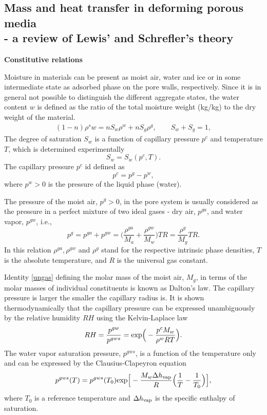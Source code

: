 \subsection{Mass and heat transfer in deforming porous media \\- a review of Lewis' and Schrefler's theory}
\label{keynote}
{\bf Constitutive relations}

Moisture in materials can be present as moist air, water and ice or in some intermediate state as adsorbed phase 
on the pore walls, respectively. Since it is in general not possible to distinguish the different aggregate states, 
the water content $w$ is defined as the ratio of the total moisture weight (kg/kg) to the dry weight of the material. 
\begin{eqnarray}\label{w_S}
(1-n) \rho^sw = nS_w\rho^w + nS_g\rho^g, \qquad S_w + S_g = 1,
\end{eqnarray}
The degree of saturation $S_w$ is a function of capillary pressure $p^c$ and temperature $T$, 
which is determined experimentally
\begin{equation}\label{Sw}
S_w = S_w(p^c,T).
\end{equation}
The capillary pressure $p^c$ id defined as
\begin{equation}\label{pc}
p^c = p^g - p^w,
\end{equation}
where $p^w > 0$ is the pressure of the liquid phase (water). 

The pressure of the moist air, $p^g > 0$, in the pore system is usually considered as the pressure in a perfect 
mixture of two ideal gases - dry air, $p^{ga}$, and water vapor, $p^{gw}$, i.e.,
\begin{equation}\label{ungas}
p^g = p^{ga} + p^{gw}=\Big( \frac{\rho^{ga}}{M_a} + \frac{\rho^{gw}}{M_w} \Big)T 
R = \frac{\rho^{g}}{M_g}T R.
\end{equation}
In this relation $\rho^{ga}, \rho^{gw}$ and $\rho^{g}$ stand for the respective intrinsic phase densities, $T$ 
is the absolute temperature, and $R$ is the universal gas constant.
 
Identity \eqref{ungas} defining the molar mass of the moist air, $M_g$, in terms of the molar masses of individual 
constituents is known as Dalton's law. The capillary pressure is larger the smaller the capillary radius is. It is shown 
thermodynamically that the capillary pressure can be expressed unambiguously by the relative humidity $RH$ using 
the Kelvin-Laplace law
\begin{equation}\label{kelvinlapl}
RH = \frac{p^{gw}}{p^{gws}} = {\rm exp} \Big( - \frac{p^c M_w}{\rho^w R T} \Big).
\end{equation}
The water vapor saturation pressure, $p^{gws}$, is a function of the temperature only and can be expressed by the 
Clausius-Clapeyron equation
\begin{equation}\label{clausius}
p^{gws}(T) = p^{gws}(T_0) {\rm exp} \Big[ - \frac{M_w \Delta h_{\rm vap}}{R} \Big(\frac{1}{T} - 
\frac{1}{T_0} \Big) \Big],
\end{equation}
where $T_0$ is a reference temperature and $\Delta h_{\rm vap}$ is the specific enthalpy of saturation.

